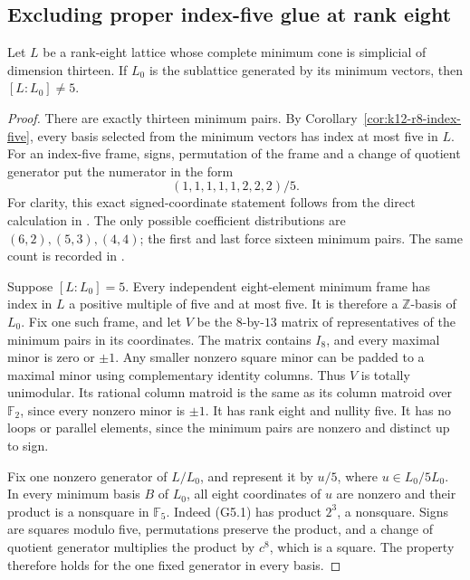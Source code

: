 \subsection{Excluding proper index-five glue at rank eight}
\label{subsec:k12-r8-glue-five}

\begin{proposition}[K17-K12-R8-GLUE5]\label{prop:k12-r8-glue-five}
Let \(L\) be a rank-eight lattice whose complete minimum cone is
simplicial of dimension thirteen.  If \(L_0\) is the sublattice
generated by its minimum vectors, then \([L:L_0]\ne5\).
\end{proposition}

\begin{proof}
There are exactly thirteen minimum pairs.  By
Corollary~\ref{cor:k12-r8-index-five}, every basis selected from
the minimum vectors has index at most five in \(L\).
For an index-five frame, signs, permutation of the frame and a
change of quotient generator put the numerator in the form
\[
                         (1,1,1,1,1,2,2,2)/5.              \tag{G5.1}
\]
For clarity, this exact signed-coordinate statement follows from
the direct calculation in
\cite[\S9, case \(d=5\), p.~31; Proposition~9.1 and full proof,
p.~33]{MartinetIndex2001}.
The only possible coefficient distributions are
\((6,2),(5,3),(4,4)\); the first and last force sixteen
minimum pairs.  The same count is recorded in
\cite[complement to \S7, p.~4]{MartinetIndexErrata2014}.

Suppose \([L:L_0]=5\).  Every independent eight-element minimum
frame has index in \(L\) a positive multiple of five and at most
five.  It is therefore a \(\mathbb Z\)-basis of \(L_0\).
Fix one such frame, and let \(V\) be the \(8\)-by-\(13\) matrix
of representatives of the minimum pairs in its coordinates.
The matrix contains \(I_8\), and every maximal minor is zero or
\(\pm1\).  Any smaller nonzero square minor can be padded to
a maximal minor using complementary identity columns.
Thus \(V\) is totally unimodular.
Its rational column matroid is the same as its column matroid
over \(\mathbb F_2\), since every nonzero minor is \(\pm1\).
It has rank eight and nullity five.  It has no loops or
parallel elements, since the minimum pairs are nonzero and
distinct up to sign.

Fix one nonzero generator of \(L/L_0\), and represent it by
\(u/5\), where \(u\in L_0/5L_0\).
In every minimum basis \(B\) of \(L_0\), all eight coordinates
of \(u\) are nonzero and their product is a nonsquare in
\(\mathbb F_5\).  Indeed (G5.1) has product \(2^3\), a
nonsquare.  Signs are squares modulo five, permutations
preserve the product, and a change of quotient generator
multiplies the product by \(c^8\), which is a square.
The property therefore holds for the one fixed generator
in every basis.


\end{proof}
